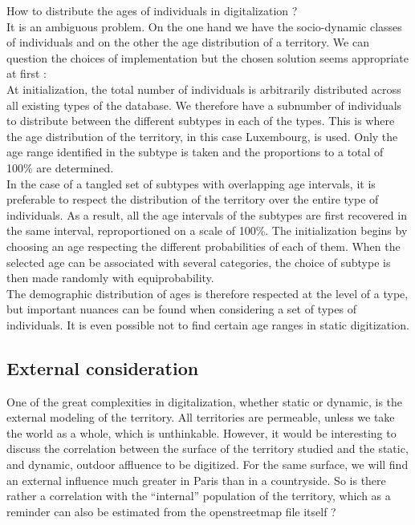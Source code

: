 How to distribute the ages of individuals in digitalization ?\\

It is an ambiguous problem. On the one hand we have the socio-dynamic classes of individuals and on the other the age distribution of a territory. We can question the choices of implementation but the chosen solution seems appropriate at first :\\

At initialization, the total number of individuals is arbitrarily distributed across all existing types of the database. We therefore have a subnumber of individuals to distribute between the different subtypes in each of the types. This is where the age distribution of the territory, in this case Luxembourg, is used. Only the age range identified in the subtype is taken and the proportions to a total of 100\% are determined.\\

In the case of a tangled set of subtypes with overlapping age intervals, it is preferable to respect the distribution of the territory over the entire type of individuals. As a result, all the age intervals of the subtypes are first recovered in the same interval, reproportioned on a scale of 100\%. The initialization begins by choosing an age respecting the different probabilities of each of them. When the selected age can be associated with several categories, the choice of subtype is then made randomly with equiprobability.\\

The demographic distribution of ages is therefore respected at the level of a type, but important nuances can be found when considering a set of types of individuals. It is even possible not to find certain age ranges in static digitization.\\

\subsection{External consideration}

One of the great complexities in digitalization, whether static or dynamic, is the external modeling of the territory. All territories are permeable, unless we take
the world as a whole, which is unthinkable. However, it would be interesting to discuss the correlation between the surface of the territory studied and the static, and dynamic, outdoor affluence to be digitized. For the same surface, we will find an external influence much greater in Paris than in a countryside. So is there rather a correlation with the ``internal'' population of the territory, which as a reminder can also be estimated from the openstreetmap file itself ?\\

